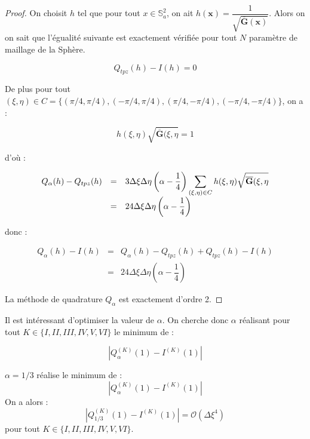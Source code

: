 \begin{proof}
On choisit $h$ tel que pour tout $x \in \mathbb{S}_a^2$, on ait $h(\mathbf{x})=\dfrac{1}{\sqrt{\overline{\mathbf{G}}(\mathbf{x})}}$. Alors on on sait que l'égualité suivante est exactement vérifiée pour tout $N$ paramètre de maillage de la Sphère.

\begin{equation}
Q_{tpz}(h)-I(h)=0
\end{equation}

De plus pour tout $(\xi,\eta) \in C=\{(\pi/4,\pi/4),(-\pi/4,\pi/4),(\pi/4,-\pi/4),(-\pi/4,-\pi/4) \}$, on a :

\begin{equation}
h(\xi,\eta)\sqrt{\overline{\mathbf{G}}(\xi,\eta}=1
\end{equation}

d'où :

\begin{equation*}
\begin{array}{rcl}
Q_{\alpha}(h)-Q_{tpz}(h) & = & 3 \Delta \xi \Delta \eta \left( \alpha - \dfrac{1}{4} \right)\displaystyle\sum\limits_{(\xi,\eta)\in C} h(\xi,\eta)\sqrt{\overline{\mathbf{G}}(\xi,\eta} \\
                         & = & 24 \Delta \xi \Delta \eta \left( \alpha - \dfrac{1}{4} \right)
\end{array}
\end{equation*}

donc :

\begin{equation*}
\begin{array}{rcl}
Q_{\alpha}(h) - I(h) & = & Q_{\alpha}(h) - Q_{tpz}(h) + Q_{tpz}(h) - I(h) \\
                    & = & 24 \Delta \xi \Delta \eta \left( \alpha - \dfrac{1}{4} \right)
\end{array}
\end{equation*}

La méthode de quadrature $Q_{\alpha}$ est exactement d'ordre 2.
\end{proof}

Il est intéressant d'optimiser la valeur de $\alpha$. On cherche donc $\alpha$ réalisant pour tout $K \in \lbrace I, II, III, IV, V, VI \rbrace$ le minimum de :

\begin{equation}
|Q_{\alpha}^{(K)}(1) - I^{(K)}(1) |
\end{equation}


\begin{proposition}
$\alpha=1/3$ réalise le minimum de :
\begin{equation}
|Q_{\alpha}^{(K)}(1) - I^{(K)}(1) |
\end{equation}
On a alors :
\begin{equation}
|Q_{1/3}^{(K)}(1) - I^{(K)}(1) | = \mathcal{O}\left( \Delta \xi^4 \right)
\end{equation}
pour tout $K \in \lbrace I, II, III, IV, V, VI \rbrace$.
\end{proposition}

